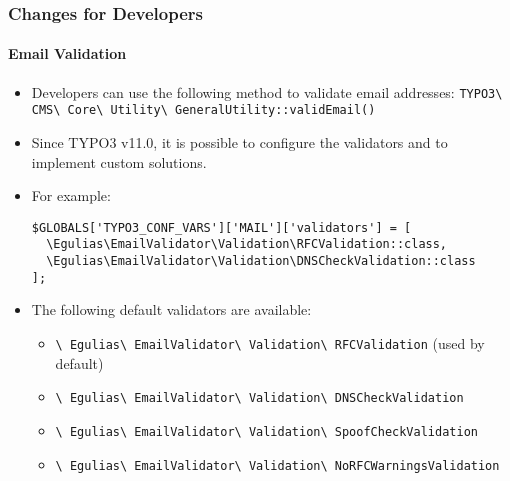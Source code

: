 %

\begin{frame}[fragile]
	\frametitle{Changes for Developers}
	\framesubtitle{Email Validation}

	\lstset{basicstyle=\smaller\ttfamily}

	\begin{itemize}
		\item Developers can use the following method to validate email addresses:
			\newline\smaller
				\texttt{TYPO3\textbackslash
					CMS\textbackslash
					Core\textbackslash
					Utility\textbackslash
					GeneralUtility::validEmail()}\normalsize

		\item Since TYPO3 v11.0, it is possible to configure the validators
			and to implement custom solutions.

		\item For example:
\begin{lstlisting}
$GLOBALS['TYPO3_CONF_VARS']['MAIL']['validators'] = [
  \Egulias\EmailValidator\Validation\RFCValidation::class,
  \Egulias\EmailValidator\Validation\DNSCheckValidation::class
];
\end{lstlisting}

		\item The following default validators are available:
			\begin{itemize}\smaller
				\item \texttt{\textbackslash
					Egulias\textbackslash
					EmailValidator\textbackslash
					Validation\textbackslash
					RFCValidation} (used by default)
				\item \texttt{\textbackslash
					Egulias\textbackslash
					EmailValidator\textbackslash
					Validation\textbackslash
					DNSCheckValidation}
				\item \texttt{\textbackslash
					Egulias\textbackslash
					EmailValidator\textbackslash
					Validation\textbackslash
					SpoofCheckValidation}
				\item \texttt{\textbackslash
					Egulias\textbackslash
					EmailValidator\textbackslash
					Validation\textbackslash
					NoRFCWarningsValidation}
			\end{itemize}
	\end{itemize}

\end{frame}

